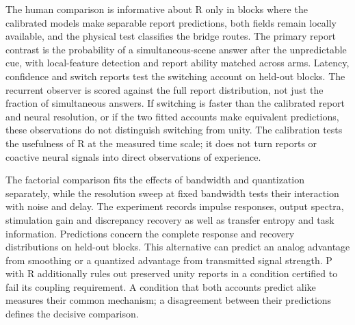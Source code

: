 \documentclass[12pt]{article}
\begin{document}
The human comparison is informative about R only in blocks where the calibrated
models make separable report predictions, both fields remain locally available,
and the physical test classifies the bridge routes. The primary report contrast
is the probability of a simultaneous-scene answer after the unpredictable cue,
with local-feature detection and report ability matched across arms. Latency,
confidence and switch reports test the switching account on held-out blocks. The
recurrent observer is scored against the full report distribution, not just the
fraction of simultaneous answers. If switching is faster than the calibrated
report and neural resolution, or if the two fitted accounts make equivalent
predictions, these observations do not distinguish switching from unity. The
calibration tests the usefulness of R at the measured time scale; it does not
turn reports or coactive neural signals into direct observations of experience.

The factorial comparison fits the effects of bandwidth and quantization
separately, while the resolution sweep at fixed bandwidth tests their
interaction with noise and delay. The experiment records impulse responses,
output spectra, stimulation gain and discrepancy recovery as well as transfer
entropy and task information. Predictions concern the complete response and
recovery distributions on held-out blocks. This alternative can predict an
analog advantage from smoothing or a quantized advantage from transmitted
signal strength. P with R additionally rules out preserved unity reports in a
condition certified to fail its coupling requirement. A condition that both
accounts predict alike measures their common mechanism; a disagreement
between their predictions defines the decisive comparison.
\end{document}

